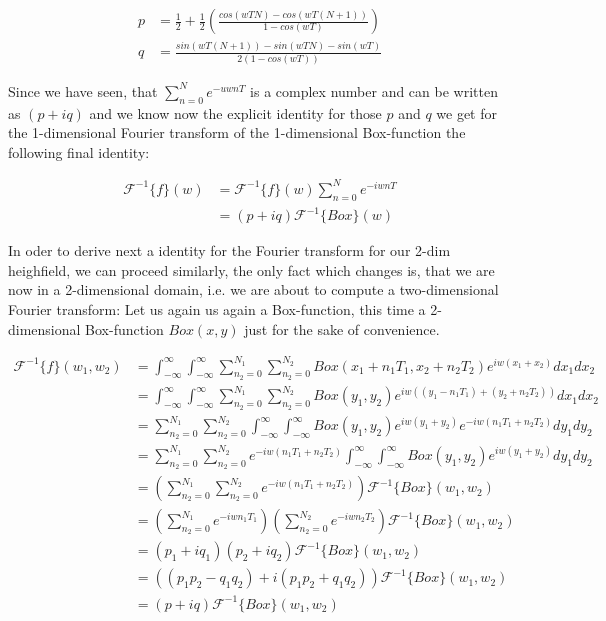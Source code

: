 \begin{align}
p& =\frac{1}{2}+\frac{1}{2}\left(\frac{cos(wTN)-cos(wT(N+1))}{1-cos(wT)}\right)\\
q& =\frac{sin(wT(N+1))-sin(wTN)-sin(wT)}{2(1-cos(wT))}
\end{align}

Since we have seen, that $\sum_{n=0}^N e^{-uwnT}$ is a complex number and can be written as $(p+iq)$ and we know now the explicit identity for those $p$ and $q$ we get for the 1-dimensional Fourier transform of the 1-dimensional Box-function the following final identity:

\begin{align*}
\mathcal{F}^{-1}\{f\}(w)
& =\mathcal{F}^{-1}\{f\}(w) \sum_{n=0}^{N} e^{-iwnT} \\
& = (p+iq) \mathcal{F}^{-1}\{Box\}(w)  
\end{align*}

In oder to derive next a identity for the Fourier transform for our 2-dim heighfield, we can proceed similarly, the only fact which changes is, that we are now in a 2-dimensional domain, i.e. we are about to compute a two-dimensional Fourier transform:
Let us again us again a Box-function, this time a 2-dimensional Box-function $Box(x,y)$ just for the sake of convenience.

\begin{align*}
\mathcal{F}^{-1}\{f\}(w_1,w_2)
& = \int_{-\infty}^{\infty}\int_{-\infty}^{\infty} \sum_{n_2=0}^{N_1} \sum_{n_2=0}^{N_2} Box(x_1 + n_1 T_1, x_2 + n_2 T_2) e^{iw(x_1 + x_2)}dx_1 dx_2 \\
& = \int_{-\infty}^{\infty}\int_{-\infty}^{\infty} \sum_{n_2=0}^{N_1} \sum_{n_2=0}^{N_2} Box(y_1, y_2) e^{iw((y_1 - n_1 T_1) + (y_2 + n_2 T_2))}dx_1 dx_2 \\
& =\sum_{n_2=0}^{N_1} \sum_{n_2=0}^{N_2} \int_{-\infty}^{\infty}\int_{-\infty}^{\infty} Box(y_1, y_2) e^{iw(y_1 + y_2)} e^{-iw(n_1 T_1 + n_2 T_2)}dy_1 dy_2 \\
& =\sum_{n_2=0}^{N_1} \sum_{n_2=0}^{N_2} e^{-iw(n_1 T_1 + n_2 T_2)} \int_{-\infty}^{\infty}\int_{-\infty}^{\infty} Box(y_1, y_2) e^{iw(y_1 + y_2)} dy_1 dy_2 \\
& =\left(\sum_{n_2=0}^{N_1} \sum_{n_2=0}^{N_2} e^{-iw(n_1 T_1 + n_2 T_2)}\right) \mathcal{F}^{-1}\{Box\}(w_1,w_2) \\
& =\left(\sum_{n_2=0}^{N_1} e^{-iw n_1 T_1}\right) \left(\sum_{n_2=0}^{N_2} e^{-iw n_2 T_2}\right) \mathcal{F}^{-1}\{Box\}(w_1,w_2) \\
& =(p_1 + i q_1)(p_2 + i q_2) \mathcal{F}^{-1}\{Box\}(w_1,w_2) \\
& =((p_1 p_2 - q_1 q_2) + i(p_1 p_2 + q_1 q_2)) \mathcal{F}^{-1}\{Box\}(w_1,w_2) \\
& =(p + iq) \mathcal{F}^{-1}\{Box\}(w_1,w_2)
\end{align*}

